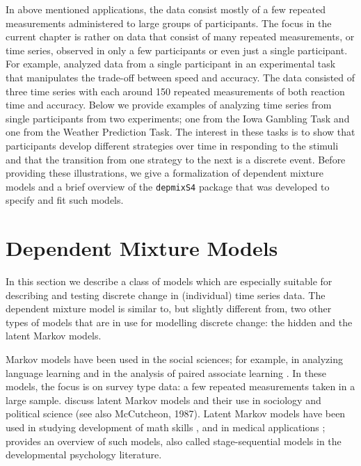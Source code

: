 \documentclass[a4paper,12pt,man]{apa} %
\newcommand{\citep}{\cite}
\newcommand{\citet}{\citeA}
\newcommand{\pkg}{\texttt}
\begin{document}
In above mentioned applications, the data consist mostly of a few
repeated measurements administered to large groups of participants.
The focus in the current chapter is rather on data that consist of
many repeated measurements, or time series, observed in only a few
participants or even just a single participant.  For example,
\citet{Visser2009} analyzed data from a single participant in an
experimental task that manipulates the trade-off between speed and
accuracy.  The data consisted of three time series with each around
150 repeated measurements of both reaction time and accuracy.  Below
we provide examples of analyzing time series from single participants
from two experiments; one from the Iowa Gambling Task and one from the
Weather Prediction Task.  The interest in these tasks is to show that
participants develop different strategies over time in responding to
the stimuli and that the transition from one strategy to the next is a
discrete event.  Before providing these illustrations, we give a
formalization of dependent mixture models and a brief overview of the
\pkg{depmixS4} package that was developed to specify and fit such
models.


\section{Dependent Mixture Models}

In this section we describe a class of models which are especially
suitable for describing and testing discrete change in (individual)
time series data.  The dependent mixture model is similar to, but
slightly different from, two other types of models that are in use for
modelling discrete change: the hidden and the latent Markov models.

Markov models have been used in the social sciences; for example, in
analyzing language learning \cite{Miller1952,Miller1963} and in the
analysis of paired associate learning \cite{Wickens1982}.  In these
models, the focus is on survey type data: a few repeated measurements
taken in a large sample.   discuss latent Markov
models and their use in sociology and political science (see also
McCutcheon, 1987).  Latent Markov models have been used in studying
development of math skills \citep{Collins1992}, and in medical
applications \citep{Reboussin1998}; \citet{Kaplan2008} provides an
overview of such models, also called stage-sequential models in the
developmental psychology literature.
\end{document}
